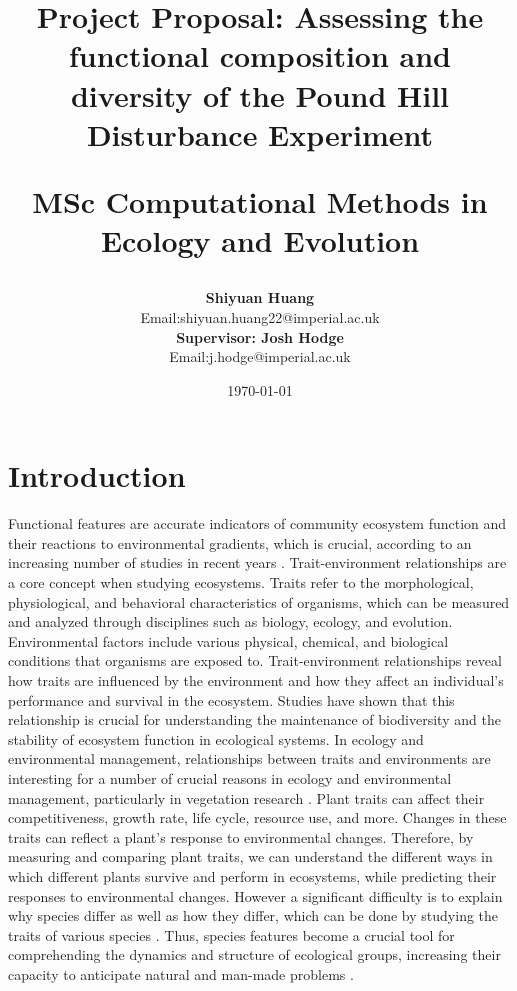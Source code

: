\documentclass[11pt]{article}
\title{Project Proposal:
\textbf{Assessing the functional composition and diversity of the Pound Hill Disturbance Experiment}

\vspace{25 pt} MSc Computational Methods in Ecology and Evolution}
\author{\textbf{Shiyuan Huang}
\\Email:shiyuan.huang22@imperial.ac.uk

\vspace{12 pt}

\textbf{Supervisor: Josh Hodge}
\\Email:j.hodge@imperial.ac.uk}
\affil{Imperial College London}
\date{\today}
\begin{document}
  \begin{titlepage}

    \maketitle
    
  \end{titlepage}

\newpage

\section{Introduction}

Functional features are accurate indicators of community ecosystem function and their reactions to environmental gradients, which is crucial, according to an increasing number of studies in recent years \cite{diaz2004plant}. Trait-environment relationships are a core concept when studying ecosystems. Traits refer to the morphological, physiological, and behavioral characteristics of organisms, which can be measured and analyzed through disciplines such as biology, ecology, and evolution. Environmental factors include various physical, chemical, and biological conditions that organisms are exposed to. Trait-environment relationships reveal how traits are influenced by the environment and how they affect an individual's performance and survival in the ecosystem. Studies have shown that this relationship is crucial for understanding the maintenance of biodiversity and the stability of ecosystem function in ecological systems. In ecology and environmental management, relationships between traits and environments are interesting for a number of crucial reasons in ecology and environmental management, particularly in vegetation research \cite{kleyer2012assessing}. Plant traits can affect their competitiveness, growth rate, life cycle, resource use, and more. Changes in these traits can reflect a plant's response to environmental changes. Therefore, by measuring and comparing plant traits, we can understand the different ways in which different plants survive and perform in ecosystems, while predicting their responses to environmental changes. However a significant difficulty is to explain why species differ as well as how they differ, which can be done by studying the traits of various species \cite{mcgill2006rebuilding}. Thus, species features become a crucial tool for comprehending the dynamics and structure of ecological groups, increasing their capacity to anticipate natural and man-made problems \cite{dray2014combining}.
\end{document}
